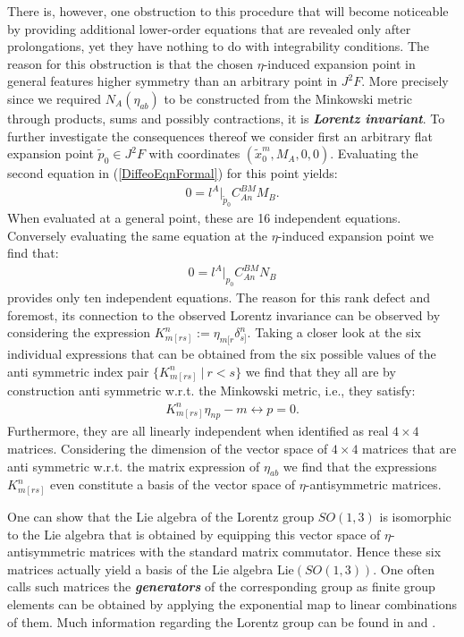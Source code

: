 There is, however, one obstruction to this procedure that will become noticeable by providing additional lower-order equations that are revealed only after prolongations, yet they have nothing to do with integrability conditions. 
The reason for this obstruction is that the chosen $\eta$-induced expansion point in general features higher symmetry than an arbitrary point in $J^2F$. More precisely since we required $N_A(\eta_{ab})$ to be constructed from the Minkowski metric through products, sums and possibly contractions, it is \textit{\textbf{Lorentz invariant}}. To further investigate the consequences thereof we consider first an arbitrary flat expansion point $\tilde{p}_0 \in J^2F$ with coordinates $(\tilde{x}_0^m,M_A,0,0)$. Evaluating the second equation in (\ref{DiffeoEqnFormal}) for this point yields:
\begin{align}
    0 = l^A \vert _{\tilde{p}_0} C^{BM}_{An}M_B.
\end{align}
When evaluated at a general point, these are 16 independent equations. 
Conversely evaluating the same equation at the $\eta$-induced expansion point we find that:
\begin{align}\label{RankDef}
    0 = l^A \vert_{p_0} C^{BM}_{An}N_B
\end{align}
provides only ten independent equations. The reason for this rank defect and foremost, its connection to the observed Lorentz invariance can be observed by considering the expression $K_{m[rs]}^n :=\eta_{m[r}\delta_{s]}^n$. 
Taking a closer look at the six individual expressions that can be obtained from the six possible values of the anti symmetric index pair  $\{K_{m[rs]}^n \ \vert \ r < s \} $ we find that they all are by construction anti symmetric w.r.t. the Minkowski metric, i.e., they satisfy: 
\begin{align}
K_{m[rs]}^n\eta_{n p} - m \leftrightarrow p = 0.
\end{align}
Furthermore, they are all linearly independent when identified as real $4 \times 4$ matrices. Considering the dimension of the vector space of $4 \times 4$ matrices that are anti symmetric w.r.t. the matrix expression of $\eta_{ab}$ we find that  the expressions $K_{m[rs]}^n$ even constitute a basis of the vector space of $\eta$-antisymmetric matrices. 

One can show that the Lie algebra of the Lorentz group $SO(1,3)$ is isomorphic to the Lie algebra that is obtained by equipping this vector space of $\eta$-antisymmetric matrices with the standard matrix commutator. Hence these six matrices actually yield a basis of the Lie algebra $\mathrm{Lie}(SO(1,3))$. One often calls such matrices the \textit{\textbf{generators}} of the corresponding group as finite group elements can be obtained by applying the exponential map to linear combinations of them. Much information regarding the Lorentz group can be found in \cite{doi:10.1142/p199} and \cite{naimark2014linear}.

